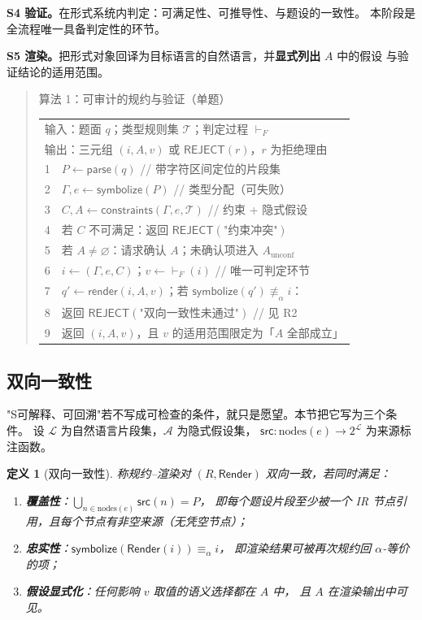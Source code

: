 \documentclass[11pt]{article}
\newtheorem{definition}{定义}[section]
\begin{document}
\textbf{S4 验证。}在形式系统内判定：可满足性、可推导性、与题设的一致性。
本阶段是全流程唯一具备判定性的环节。

\textbf{S5 渲染。}把形式对象回译为目标语言的自然语言，并\textbf{显式列出} $A$ 中的假设
与验证结论的适用范围。

\begin{quote}\ttfamily\small
算法 1：可审计的规约与验证（单题）\\
\begin{tabular}{@{}p{}@{}}
输入：题面 $q$；类型规则集 $\mathcal{T}$；判定过程 $\vdash_F$\\
输出：三元组 $(i, A, v)$ 或 $\mathsf{REJECT}(r)$，$r$ 为拒绝理由\\
1\ \ $P \leftarrow \mathsf{parse}(q)$ \hfill // 带字符区间定位的片段集\\
2\ \ $\Gamma, e \leftarrow \mathsf{symbolize}(P)$ \hfill // 类型分配（可失败）\\
3\ \ $C, A \leftarrow \mathsf{constraints}(\Gamma, e, \mathcal{T})$ \hfill // 约束 + 隐式假设\\
4\ \ 若 $C$ 不可满足：返回 $\mathsf{REJECT}(\text{"约束冲突"})$\\
5\ \ 若 $A \neq \varnothing$：请求确认 $A$；未确认项进入 $A_{\text{unconf}}$\\
6\ \ $i \leftarrow (\Gamma, e, C)$；$v \leftarrow \vdash_F(i)$ \hfill // 唯一可判定环节\\
7\ \ $q' \leftarrow \mathsf{render}(i, A, v)$；若 $\mathsf{symbolize}(q') \not\equiv_\alpha i$：\\
8\ \ \hspace{1em}返回 $\mathsf{REJECT}(\text{"双向一致性未通过"})$ \hfill // 见 R2\\
9\ \ 返回 $(i, A, v)$，且 $v$ 的适用范围限定为「$A$ 全部成立」
\end{tabular}
\end{quote}

\subsection{双向一致性}
\label{subsec:bidir}
"S可解释、可回溯"若不写成可检查的条件，就只是愿望。本节把它写为三个条件。
设 $\mathcal{L}$ 为自然语言片段集，$\mathcal{A}$ 为隐式假设集，
$\mathsf{src} : \mathrm{nodes}(e) \to 2^{\mathcal{L}}$ 为来源标注函数。

\begin{definition}[双向一致性]
称规约--渲染对 $(R, \mathsf{Render})$ \emph{双向一致}，若同时满足：
\begin{enumerate}[leftmargin=1.6em,itemsep=1pt]
\item[\textbf{(R1)}] \textbf{覆盖性}：$\bigcup_{n \in \mathrm{nodes}(e)} \mathsf{src}(n) = P$，
即每个题设片段至少被一个 IR 节点引用，且每个节点有非空来源（无凭空节点）；
\item[\textbf{(R2)}] \textbf{忠实性}：$\mathsf{symbolize}(\mathsf{Render}(i)) \equiv_\alpha i$，
即渲染结果可被再次规约回 $\alpha$-等价的项；
\item[\textbf{(R3)}] \textbf{假设显式化}：任何影响 $v$ 取值的语义选择都在 $A$ 中，
且 $A$ 在渲染输出中可见。
\end{enumerate}
\end{definition}
\end{document}
